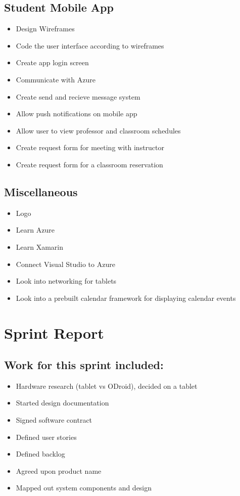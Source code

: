 \documentclass{article}
\begin{document}
\subsection*{Student Mobile App}
\begin{itemize}
	\item Design Wireframes
	\item Code the user interface according to wireframes
	\item Create app login screen
	\item Communicate with Azure
	\item Create send and recieve message system
	\item Allow push notifications on mobile app
	\item Allow user to view professor and classroom schedules
	\item Create request form for meeting with instructor
	\item Create request form for a classroom reservation 
\end{itemize}

\subsection*{Miscellaneous}
\begin{itemize}
	\item Logo
	\item Learn Azure
	\item Learn Xamarin
	\item Connect Visual Studio to Azure
	\item Look into networking for tablets
	\item Look into a prebuilt calendar framework for displaying calendar events
\end{itemize}

\pagebreak

\section*{Sprint Report}
\subsection*{Work for this sprint included:}
\begin{itemize}
	\item Hardware research (tablet vs ODroid), decided on a tablet
	\item Started design documentation
	\item Signed software contract
	\item Defined user stories
	\item Defined backlog
	\item Agreed upon product name
	\item Mapped out system components and design
\end{itemize}
\end{document}
